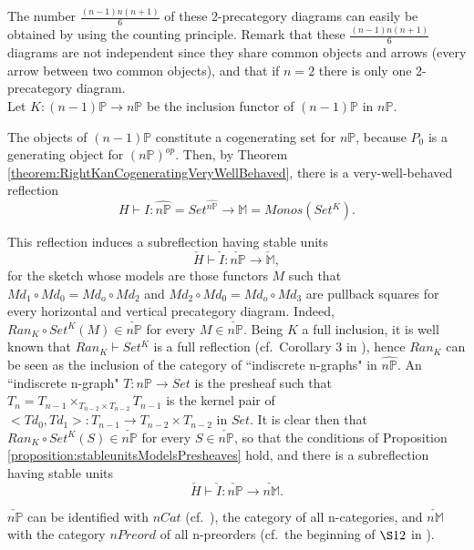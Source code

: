 \documentclass[12pt,a4paper]{amsart}
\theoremstyle{definition}
\begin{document}

\vspace{80pt}

The number $\frac{(n-1)n(n+1)}{6}$ of these 2-precategory diagrams can easily be obtained by using the counting principle. Remark that these $\frac{(n-1)n(n+1)}{6}$ diagrams are not independent since they share common objects and arrows (every arrow between two common objects), and that if $n=2$ there is only one 2-precategory diagram.\\

Let $K:(n-1)\mathbb{P}\rightarrow n\mathbb{P}$ be the inclusion functor of $(n-1)\mathbb{P}$ in $n\mathbb{P}$.

The objects of $(n-1)\mathbb{P}$ constitute a cogenerating set for $n\mathbb{P}$, because $P_0$ is a generating object for $(n\mathbb{P})^{op}$. Then, by Theorem \ref{theorem:RightKanCogeneratingVeryWellBehaved}, there is a very-well-behaved reflection $$H\vdash I:\hat{n\mathbb{P}}=Set^{\hat{n\mathbb{P}}}\rightarrow \mathbb{M}=Monos(Set^K).$$

This reflection induces a subreflection having stable units $$\check{H}\vdash \check{I}:\check{n\mathbb{P}}\rightarrow \check{\mathbb{M}},$$ for the sketch whose models are those functors $M$ such that $Md_1\circ Md_0=Md_o\circ Md_2$ and $Md_2\circ Md_0=Md_o\circ Md_3$ are pullback squares for every horizontal and vertical precategory diagram. Indeed, $Ran_K\circ Set^K(M)\in \check{n\mathbb{P}}$ for every $M\in \check{n\mathbb{P}}$. Being $K$ a full inclusion, it is well known that $Ran_K\vdash Set^K$ is a full reflection (cf.\ Corollary 3 in \cite[\S X.3]{SM:cat}), hence $Ran_K$ can be seen as the inclusion of the category of ``indiscrete n-graphs" in $\hat{n\mathbb{P}}$. An ``indiscrete n-graph" $T:n\mathbb{P}\rightarrow Set$ is the presheaf such that $T_n=T_{n-1}\times_{T_{n-2}\times T_{n-2}}T_{n-1}$ is the kernel pair of $<Td_0,Td_1>:T_{n-1}\rightarrow T_{n-2}\times T_{n-2}$ in $Set$. It is clear then that $Ran_K\circ Set^K(S)\in \check{n\mathbb{P}}$ for every $S\in \check{n\mathbb{P}}$, so that the conditions of Proposition \ref{proposition:stableunitsModelsPresheaves} hold, and there is a subreflection having stable units $$\check{H}\vdash \check{I}: \check{n\mathbb{P}}\rightarrow \check{n\mathbb{M}}.$$

$\check{n\mathbb{P}}$ can be identified with $nCat$ (cf.\ \cite[\S 10]{X:nml}), the category of all n-categories, and $\check{n\mathbb{M}}$ with the category $nPreord$ of all n-preorders (cf.\ the beginning of $\S 12$ in \cite{X:nml}).
\end{document}
